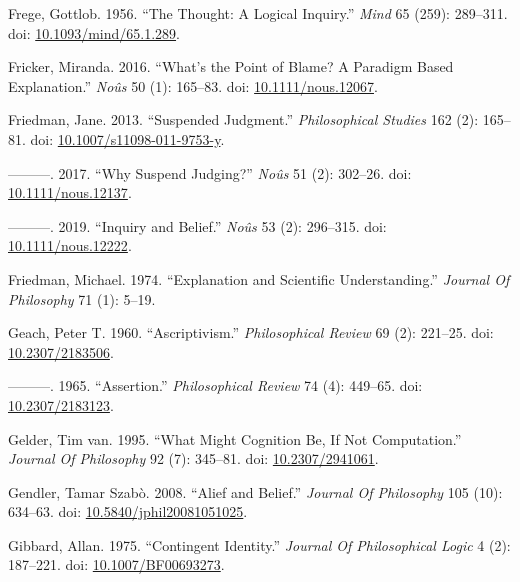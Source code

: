 \documentclass[
  10pt,
  letterpaper,
  DIV=11,
  numbers=noendperiod,
  twoside]{scrartcl}
\newlength{\cslhangindent}
\newenvironment{CSLReferences}[2] %
 {\begin{list}{}{%
  \setlength{\itemindent}{0pt}
  \setlength{\leftmargin}{0pt}
  \setlength{\parsep}{0pt}
  \ifodd #1
   \setlength{\leftmargin}{\cslhangindent}
   \setlength{\itemindent}{-1\cslhangindent}
  \fi
  \setlength{\itemsep}{#2\baselineskip}}}
 {\end{list}}
\begin{document}
\begin{CSLReferences}{1}{0}
Frege, Gottlob. 1956. {``The Thought: A Logical Inquiry.''} \emph{Mind}
65 (259): 289--311. doi:
\href{https://doi.org/10.1093/mind/65.1.289}{10.1093/mind/65.1.289}.

Fricker, Miranda. 2016. {``What's the Point of Blame? A Paradigm Based
Explanation.''} \emph{Noûs} 50 (1): 165--83. doi:
\href{https://doi.org/10.1111/nous.12067}{10.1111/nous.12067}.

Friedman, Jane. 2013. {``Suspended Judgment.''} \emph{Philosophical
Studies} 162 (2): 165--81. doi:
\href{https://doi.org/10.1007/s11098-011-9753-y}{10.1007/s11098-011-9753-y}.

---------. 2017. {``Why Suspend Judging?''} \emph{Noûs} 51 (2): 302--26.
doi: \href{https://doi.org/10.1111/nous.12137}{10.1111/nous.12137}.

---------. 2019. {``Inquiry and Belief.''} \emph{Noûs} 53 (2): 296--315.
doi: \href{https://doi.org/10.1111/nous.12222}{10.1111/nous.12222}.

Friedman, Michael. 1974. {``Explanation and Scientific Understanding.''}
\emph{Journal Of Philosophy} 71 (1): 5--19.

Geach, Peter T. 1960. {``Ascriptivism.''} \emph{Philosophical Review} 69
(2): 221--25. doi:
\href{https://doi.org/10.2307/2183506}{10.2307/2183506}.

---------. 1965. {``Assertion.''} \emph{Philosophical Review} 74 (4):
449--65. doi: \href{https://doi.org/10.2307/2183123}{10.2307/2183123}.

Gelder, Tim van. 1995. {``What Might Cognition Be, If Not
Computation.''} \emph{Journal Of Philosophy} 92 (7): 345--81. doi:
\href{https://doi.org/10.2307/2941061}{10.2307/2941061}.

Gendler, Tamar Szabò. 2008. {``Alief and Belief.''} \emph{Journal Of
Philosophy} 105 (10): 634--63. doi:
\href{https://doi.org/10.5840/jphil20081051025}{10.5840/jphil20081051025}.

Gibbard, Allan. 1975. {``Contingent Identity.''} \emph{Journal Of
Philosophical Logic} 4 (2): 187--221. doi:
\href{https://doi.org/10.1007/BF00693273}{10.1007/BF00693273}.


\end{CSLReferences}
\end{document}
